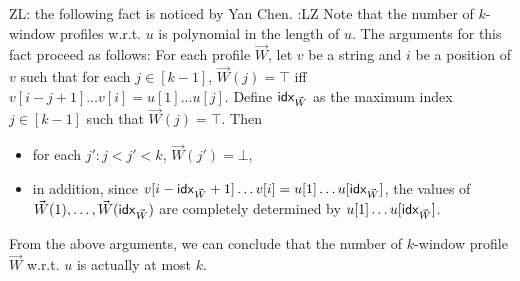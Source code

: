 \documentclass[sigplan,10pt,review,anonymous]{acmart}\settopmatter{printfolios=true}
\newcommand{\zhilin}[1]{\color{cyan} {ZL: #1 :LZ} \color{black}}
\begin{document}
\zhilin{the following fact is noticed by Yan Chen.} 
Note that the number of $k$-window profiles w.r.t. $u$ is polynomial in the length of $u$. The arguments for this fact proceed as follows: For each profile $\vec{W}$, let $v$ be a string and $i$ be a position of $v$ such that for each $j \in [k-1]$, $\vec{W}(j) = \top$ iff $v[i-j+1] \dots v[i] = u[1] \dots u[j]$. Define ${\sf idx}_{\vec{W}}$ as the maximum index $j \in [k-1]$ such that $\vec{W}(j)=\top$. Then 
\begin{itemize}
	\item for each $j': j < j' < k$, $\vec{W}(j')=\bot$, 
	\item in addition, since $v[i-{\sf idx}_{\vec{W}}+1] \dots v[i] = u[1] \dots u[{\sf idx}_{\vec{W}}]$, the values of $\vec{W}(1),\dots, \vec{W}({\sf idx}_{\vec{W}})$ are completely determined by $u[1] \dots u[{\sf idx}_{\vec{W}}]$.
\end{itemize}
From the above arguments, we can  conclude that the number of $k$-window profile $\vec{W}$ w.r.t. $u$ is actually at most $k$.

\smallskip
\end{document}

